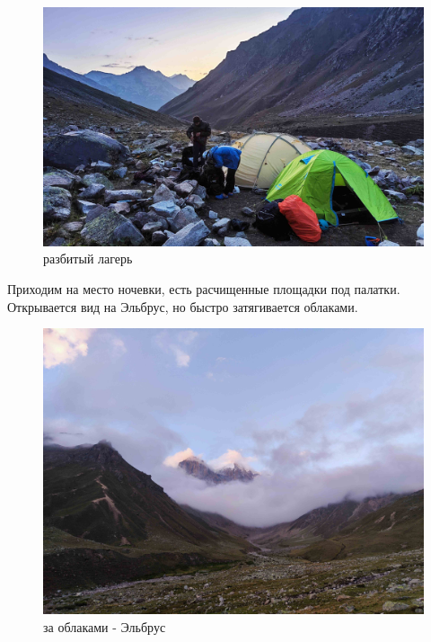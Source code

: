\begin{figure}[h!]
	\centering
	\includegraphics[width=0.7\linewidth]{../pics/IMG_20240829_191225.jpg}
	\caption{разбитый лагерь}
	\label{fig:IMG_20240829_191225.jpg}
\end{figure}

Приходим на место ночевки, есть расчищенные площадки под палатки. Открывается вид на Эльбрус, но быстро затягивается облаками.

\begin{figure}[h!]
	\centering
	\includegraphics[width=0.7\linewidth]{../pics/IMG_20240829_184033}
	\caption{за облаками - Эльбрус}
	\label{fig:IMG_20240829_184033}
\end{figure}

\newpage